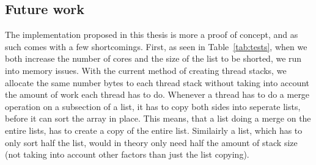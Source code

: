 \subsection{Future work}
The implementation proposed in this thesis is more a proof of concept, and as
such comes with a few shortcomings. First, as seen in Table~\ref{tab:tests},
when we both increase the number of cores and the size of the list to be
shorted, we run into memory issues. With the current method of creating thread
stacks, we allocate the same number bytes to each thread stack without taking
into account the amount of work each thread has to do. Whenever a thread has to
do a merge operation on a subsection of a list, it has to copy both sides into
seperate lists, before it can sort the array in place. This means, that a list
doing a merge on the entire lists, has to create a copy of the entire list.
Similairly a list, which has to only sort half the list, would in theory only
need half the amount of stack size (not taking into account other factors than
just the list copying).





